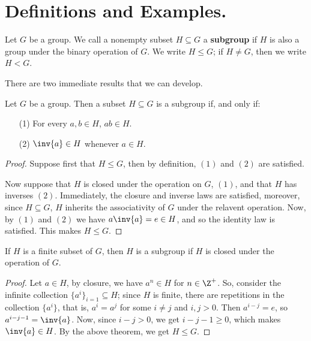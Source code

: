 
\section{Definitions and Examples.}
\label{section1}

\begin{definition}
    Let $G$ be a group. We call a nonempty subset $H \subseteq G$ a
    \textbf{subgroup} if $H$ is also a group under the binary operation of  $G$.
    We write  $H \leq G$; if $H \neq G$, then we write $H < G$.
\end{definition}

There are two immediate results that we can develop.

\begin{theorem}\label{2.1.1}
    Let $G$ be a group. Then a subset  $H \subseteq G$ is a subgroup if, and
    only if:
    \begin{enumerate}
        \item[(1)] For every $a,b \in H$,  $ab \in H$.

        \item[(2)] $\inv{a} \in H$ whenever $a \in H$.
    \end{enumerate}
\end{theorem}
\begin{proof}
    Suppose first that $H \leq G$, then by definition, $(1)$ and $(2)$ are
    satisfied.

    Now suppose that $H$ is closed under the operation on  $G$,  $(1)$, and that
    $H$ has inverses  $(2)$. Immediately, the closure and inverse laws are
    satisfied, moreover, since $H \subseteq G$,  $H$ inherits the associativity
    of  $G$ under the relavent operation. Now, by $(1)$ and $(2)$ we have
    $a\inv{a}=e \in H$, and so the identity law is satisfied. This makes $H \leq
    G$.
\end{proof}
\begin{corollary}
    If $H$ is a finite subset of  $G$, then  $H$ is a subgroup if  $H$ is closed
    under the operation of  $G$.
\end{corollary}
\begin{proof}
    Let $a \in H$, by closure, we have  $a^n \in H$ for $n \in \Z^+$. So,
    consider the infinite collection $\{a^i\}_{i=1} \subseteq H$; since $H$ is
    finite, there are repetitions in the collection  $\{a^i\}$, that is, $
    a^i=a^j$ for some  $i \neq j$ and  $i,j>0$. Then  $a^{i-j}=e$, so
    $a^{i-j-1}=\inv{a}$. Now, since $i-j>0$, we get  $i-j-1 \geq 0$, which makes
     $\inv{a} \in H$. By the above theorem, we get $H \leq G$.
\end{proof}

